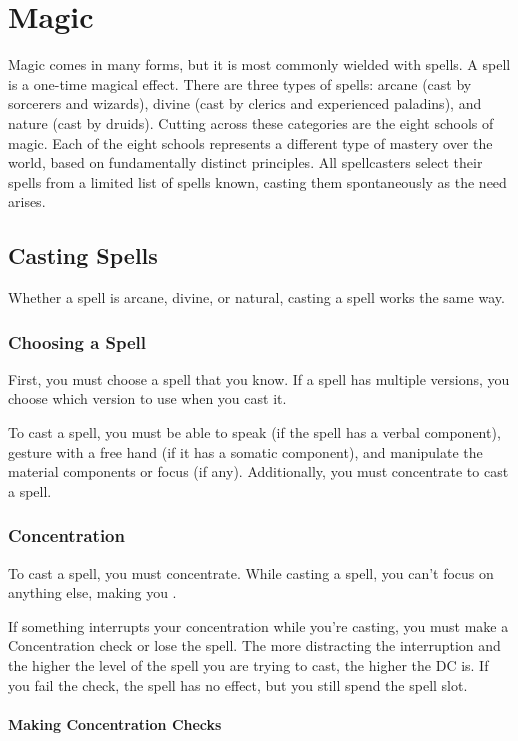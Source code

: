 \chapter{Magic}\label{Magic}
Magic comes in many forms, but it is most commonly wielded with spells. A spell is a one-time magical effect. There are three types of spells: arcane (cast by sorcerers and wizards), divine (cast by clerics and experienced paladins), and nature (cast by druids). Cutting across these categories are the eight schools of magic. Each of the eight schools represents a different type of mastery over the world, based on fundamentally distinct principles. All spellcasters select their spells from a limited list of spells known, casting them spontaneously as the need arises.

\section{Casting Spells}\label{Casting Spells}
Whether a spell is arcane, divine, or natural, casting a spell works the same way.

\subsection{Choosing a Spell}
First, you must choose a spell that you know. If a spell has multiple versions, you choose which version to use when you cast it.

To cast a spell, you must be able to speak (if the spell has a verbal component), gesture with a free hand (if it has a somatic component), and manipulate the material components or focus (if any). Additionally, you must concentrate to cast a spell.

\subsection{Concentration}
To cast a spell, you must concentrate. While casting a spell, you can't focus on anything else, making you .

If something interrupts your concentration while you're casting, you must make a Concentration check or lose the spell. The more distracting the interruption and the higher the level of the spell you are trying to cast, the higher the DC is. If you fail the check, the spell has no effect, but you still spend the spell slot.

\subsubsection{Making Concentration Checks}

